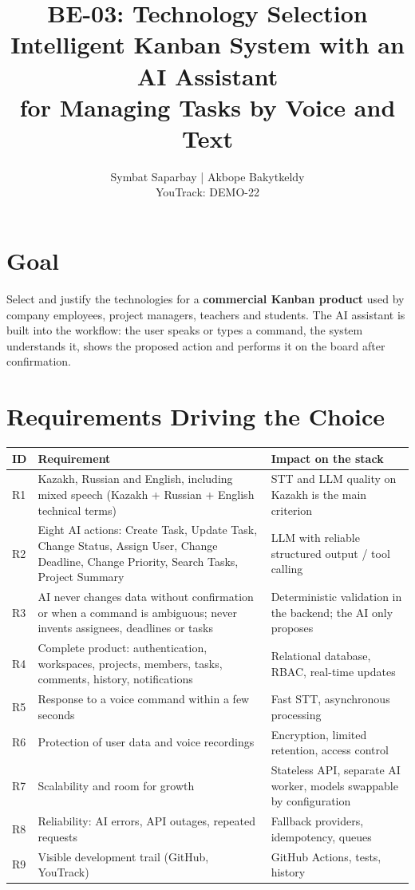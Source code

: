 \documentclass[11pt,a4paper]{article}
\title{\textbf{BE-03: Technology Selection}\\[4pt]
\large Intelligent Kanban System with an AI Assistant\\ for Managing Tasks by Voice and Text}
\author{Symbat Saparbay | Akbope Bakytkeldy\\ \small YouTrack: DEMO-22}
\date{}
\newcommand{\tblstart}{\small\rowcolors{2}{gray!7}{white}}
\begin{document}
\maketitle

\tableofcontents
\newpage

\section{Goal}

Select and justify the technologies for a \textbf{commercial Kanban product} used by company employees, project managers, teachers and students. The AI assistant is built into the workflow: the user speaks or types a command, the system understands it, shows the proposed action and performs it on the board after confirmation.

\section{Requirements Driving the Choice}

{\tblstart
\begin{xltabular}{\textwidth}{P{0.9cm} P{6.4cm} L}
\toprule
\textbf{ID} & \textbf{Requirement} & \textbf{Impact on the stack} \\
\midrule
\endhead
R1 & Kazakh, Russian and English, including mixed speech (Kazakh + Russian + English technical terms) & STT and LLM quality on Kazakh is the main criterion \\
R2 & Eight AI actions: Create Task, Update Task, Change Status, Assign User, Change Deadline, Change Priority, Search Tasks, Project Summary & LLM with reliable structured output / tool calling \\
R3 & AI never changes data without confirmation or when a command is ambiguous; never invents assignees, deadlines or tasks & Deterministic validation in the backend; the AI only proposes \\
R4 & Complete product: authentication, workspaces, projects, members, tasks, comments, history, notifications & Relational database, RBAC, real-time updates \\
R5 & Response to a voice command within a few seconds & Fast STT, asynchronous processing \\
R6 & Protection of user data and voice recordings & Encryption, limited retention, access control \\
R7 & Scalability and room for growth & Stateless API, separate AI worker, models swappable by configuration \\
R8 & Reliability: AI errors, API outages, repeated requests & Fallback providers, idempotency, queues \\
R9 & Visible development trail (GitHub, YouTrack) & GitHub Actions, tests, history \\
\bottomrule
\end{xltabular}}
\end{document}
